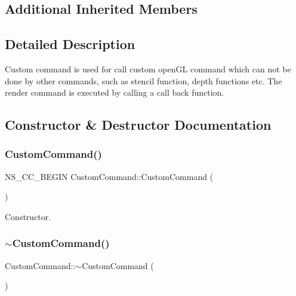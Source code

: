 \subsection*{Additional Inherited Members}


\subsection{Detailed Description}
Custom command is used for call custom open\+GL command which can not be done by other commands, such as stencil function, depth functions etc. The render command is executed by calling a call back function. 

\subsection{Constructor \& Destructor Documentation}
\mbox{\label{classCustomCommand_a691e7a5f2b5148b2c38770ffc3fd8583}} 
\subsubsection{\texorpdfstring{Custom\+Command()}{CustomCommand()}\hspace{0.1cm}{\footnotesize\ttfamily [1/2]}}
{\footnotesize\ttfamily N\+S\+\_\+\+C\+C\+\_\+\+B\+E\+G\+IN Custom\+Command\+::\+Custom\+Command (\begin{DoxyParamCaption}{ }\end{DoxyParamCaption})}

Constructor. \mbox{\label{classCustomCommand_a496664561533d0ba30f2675e4072cf72}} 
\subsubsection{\texorpdfstring{$\sim$\+Custom\+Command()}{~CustomCommand()}\hspace{0.1cm}{\footnotesize\ttfamily [1/2]}}
{\footnotesize\ttfamily Custom\+Command\+::$\sim$\+Custom\+Command (\begin{DoxyParamCaption}{ }\end{DoxyParamCaption})}

